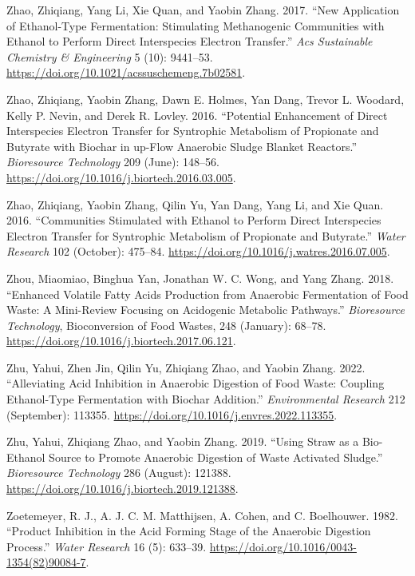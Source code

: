 \documentclass[11pt]{report}
\begin{document}
\begin{hangparas}{1.5em}{1}
\hypertarget{citeproc_bib_item_99}{Zhao, Zhiqiang, Yang Li, Xie Quan, and Yaobin Zhang. 2017. “New Application of Ethanol-Type Fermentation: Stimulating Methanogenic Communities with Ethanol to Perform Direct Interspecies Electron Transfer.” \textit{Acs Sustainable Chemistry \& Engineering} 5 (10): 9441–53. \url{https://doi.org/10.1021/acssuschemeng.7b02581}.}

\hypertarget{citeproc_bib_item_100}{Zhao, Zhiqiang, Yaobin Zhang, Dawn E. Holmes, Yan Dang, Trevor L. Woodard, Kelly P. Nevin, and Derek R. Lovley. 2016. “Potential Enhancement of Direct Interspecies Electron Transfer for Syntrophic Metabolism of Propionate and Butyrate with Biochar in up-Flow Anaerobic Sludge Blanket Reactors.” \textit{Bioresource Technology} 209 (June): 148–56. \url{https://doi.org/10.1016/j.biortech.2016.03.005}.}

\hypertarget{citeproc_bib_item_101}{Zhao, Zhiqiang, Yaobin Zhang, Qilin Yu, Yan Dang, Yang Li, and Xie Quan. 2016. “Communities Stimulated with Ethanol to Perform Direct Interspecies Electron Transfer for Syntrophic Metabolism of Propionate and Butyrate.” \textit{Water Research} 102 (October): 475–84. \url{https://doi.org/10.1016/j.watres.2016.07.005}.}

\hypertarget{citeproc_bib_item_102}{Zhou, Miaomiao, Binghua Yan, Jonathan W. C. Wong, and Yang Zhang. 2018. “Enhanced Volatile Fatty Acids Production from Anaerobic Fermentation of Food Waste: A Mini-Review Focusing on Acidogenic Metabolic Pathways.” \textit{Bioresource Technology}, Bioconversion of Food Wastes, 248 (January): 68–78. \url{https://doi.org/10.1016/j.biortech.2017.06.121}.}

\hypertarget{citeproc_bib_item_103}{Zhu, Yahui, Zhen Jin, Qilin Yu, Zhiqiang Zhao, and Yaobin Zhang. 2022. “Alleviating Acid Inhibition in Anaerobic Digestion of Food Waste: Coupling Ethanol-Type Fermentation with Biochar Addition.” \textit{Environmental Research} 212 (September): 113355. \url{https://doi.org/10.1016/j.envres.2022.113355}.}

\hypertarget{citeproc_bib_item_104}{Zhu, Yahui, Zhiqiang Zhao, and Yaobin Zhang. 2019. “Using Straw as a Bio-Ethanol Source to Promote Anaerobic Digestion of Waste Activated Sludge.” \textit{Bioresource Technology} 286 (August): 121388. \url{https://doi.org/10.1016/j.biortech.2019.121388}.}

\hypertarget{citeproc_bib_item_105}{Zoetemeyer, R. J., A. J. C. M. Matthijsen, A. Cohen, and C. Boelhouwer. 1982. “Product Inhibition in the Acid Forming Stage of the Anaerobic Digestion Process.” \textit{Water Research} 16 (5): 633–39. \url{https://doi.org/10.1016/0043-1354(82)90084-7}.}


\end{hangparas}
\end{document}
